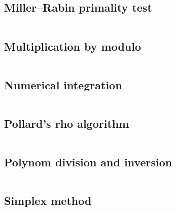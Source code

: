\documentclass{article}
\begin{document}
\subsection{Miller–Rabin primality test}
\inputminted[mathescape, breaklines, breakafter=(, tabsize=2, frame=lines, showtabs, tab=|\ , tabcolor=lightgray]{c++}{./numeric/miller-rabin/miller-rabin.cpp}
\subsection{Multiplication by modulo}
\inputminted[mathescape, breaklines, breakafter=(, tabsize=2, frame=lines, showtabs, tab=|\ , tabcolor=lightgray]{c++}{./numeric/mult-by-mod/mult-by-mod.cpp}
\subsection{Numerical integration}
\inputminted[mathescape, breaklines, breakafter=(, tabsize=2, frame=lines, showtabs, tab=|\ , tabcolor=lightgray]{c++}{./numeric/numerical-integration/numerical-integration.cpp}
\subsection{Pollard's rho algorithm}
\inputminted[mathescape, breaklines, breakafter=(, tabsize=2, frame=lines, showtabs, tab=|\ , tabcolor=lightgray]{c++}{./numeric/pollard/pollard.cpp}
\subsection{Polynom division and inversion}
\inputminted[mathescape, breaklines, breakafter=(, tabsize=2, frame=lines, showtabs, tab=|\ , tabcolor=lightgray]{c++}{./numeric/polynom-division/polynom-division.cpp}
\subsection{Simplex method}
\inputminted[mathescape, breaklines, breakafter=(, tabsize=2, frame=lines, showtabs, tab=|\ , tabcolor=lightgray]{c++}{./numeric/simplex/simplex.cpp}
\end{document}

